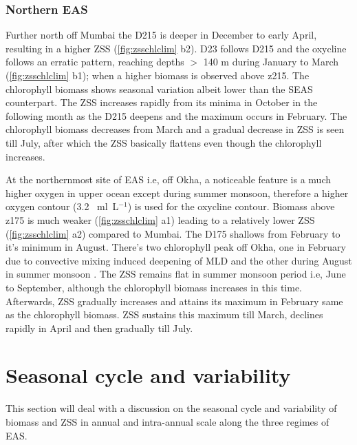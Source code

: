 \documentclass{article}
\begin{document}
		\subsubsection{Northern EAS}
		Further north off Mumbai the D215 is deeper in December to early April, resulting in a higher ZSS (\cref{fig:zsschlclim} b2). D23 follows D215 and the oxycline follows an erratic pattern, reaching depths $>$ 140 m during January to March (\cref{fig:zsschlclim} b1); when a higher biomass is observed above z215. The chlorophyll biomass shows seasonal variation albeit lower than the SEAS counterpart. The ZSS increases rapidly from its minima in October in the following month as the D215 deepens and the maximum occurs in February. The chlorophyll biomass decreases from March and a gradual decrease in ZSS is seen till July, after which the ZSS basically flattens even though the chlorophyll increases. 
	
		At the northernmost site of EAS i.e, off Okha, a noticeable feature is a much higher oxygen in upper ocean except during summer monsoon, therefore  a higher oxygen contour (3.2 ~ml~L$^{-1}$) is used for the oxycline contour. Biomass above z175 is much weaker (\cref{fig:zsschlclim} a1) leading to a relatively lower ZSS (\cref{fig:zsschlclim} a2) compared to Mumbai. The D175 shallows from February to it's minimum in August. There's two chlorophyll peak off Okha, one in February due to convective mixing induced deepening of MLD \citep{wiggert2005monsoon,levy2007basin,keerthi2017physical,shankar2016inhibition} and the other during August in summer monsoon \citep{wiggert2005monsoon,levy2007basin}. The ZSS remains flat in summer monsoon period i.e, June to September, although the chlorophyll biomass increases in this time. Afterwards, ZSS gradually increases and attains its maximum in February same as the chlorophyll biomass. ZSS sustains this maximum till March, declines rapidly in April and then gradually till July.
	 
	

	 
	\section{Seasonal cycle and variability}
	\label{sec:seasonalcyclezss}
	This section will deal with a discussion on the seasonal cycle and variability of biomass and ZSS in annual and intra-annual scale along the three regimes of EAS. 
	
\end{document}
